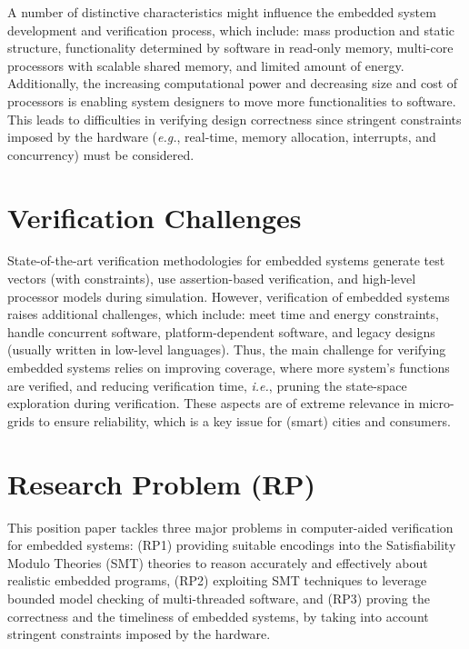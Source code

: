 \documentclass{acm_sen_article}
\begin{document}
A number of distinctive characteristics might influence the embedded system development and verification process, which include: mass production and static structure, functionality determined by software in read-only memory, multi-core processors with scalable shared memory, and limited amount of energy. Additionally, the increasing computational power and decreasing size and cost of processors is enabling system designers to move more functionalities to software. This leads to difficulties in verifying design correctness since stringent constraints imposed by the hardware ({\it e.g.}, real-time, memory allocation, interrupts, and concurrency) must be considered.

\section{Verification Challenges}

State-of-the-art verification methodologies for embedded systems generate test vectors (with constraints), use assertion-based verification, and high-level processor models during simulation. However, verification of embedded systems raises additional challenges, which include: meet time and energy constraints, handle concurrent software, platform-dependent software, and legacy designs (usually written in low-level languages). Thus, the main challenge for verifying embedded systems relies on improving coverage, where more system's functions are verified, and reducing verification time, {\it i.e.}, pruning the state-space exploration during verification. These aspects are of extreme relevance in micro-grids to ensure reliability, which is a key issue for (smart) cities and consumers.

\section{Research Problem (RP)}

This position paper tackles three major problems in computer-aided verification for embedded systems: (RP1) providing suitable encodings into the Satisfiability Modulo Theories (SMT) theories to reason accurately and effectively about realistic embedded programs, (RP2) exploiting SMT techniques to leverage bounded model checking of multi-threaded software, and (RP3) proving the correctness and the timeliness of embedded systems, by taking into account stringent constraints imposed by the hardware.
\end{document}
